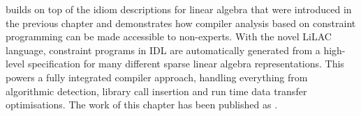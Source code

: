     {\bf{}} builds on top of the idiom descriptions for linear
    algebra that were introduced in the previous chapter and demonstrates how
    compiler analysis based on constraint programming can be made accessible to
    non-experts.
    With the novel LiLAC language, constraint programs in IDL are automatically
    generated from a high-level specification for many different sparse linear
    algebra representations.
    This powers a fully integrated compiler approach, handling everything from
    algorithmic detection, library call insertion and run time data transfer
    optimisations.
    The work of this chapter has been published as \citet{lilacpaper}.
